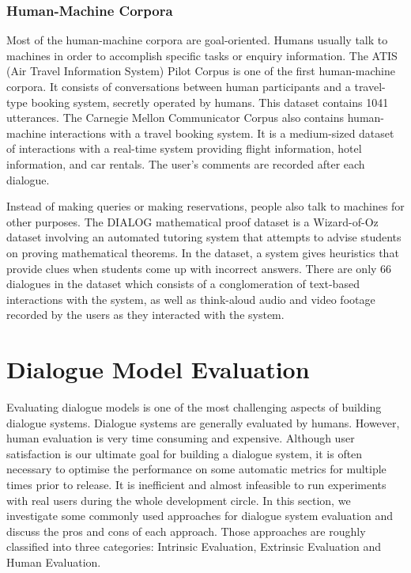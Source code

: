 \documentclass[bsc,frontabs,twoside,singlespacing,parskip,deptreport]{infthesis}     %
\begin{document}
\subsubsection*{Human-Machine Corpora}

Most of the human-machine corpora are goal-oriented. Humans usually talk to machines in order to accomplish specific tasks or enquiry information. The ATIS (Air Travel Information System) Pilot Corpus \cite{hemphill1990atis} is one of the first human-machine corpora. It consists of conversations between human participants and a travel-type booking system, secretly operated by humans. This dataset contains 1041 utterances. The Carnegie Mellon Communicator Corpus \cite{bennett2002carnegie} also contains human-machine interactions with a travel booking system. It is a medium-sized dataset of interactions with a real-time system providing flight information, hotel information, and car rentals. The user’s comments are recorded after each dialogue.

Instead of making queries or making reservations, people also talk to machines for other purposes. The DIALOG mathematical proof dataset \cite{wolska2004annotated} is a Wizard-of-Oz dataset involving an automated tutoring system that attempts to advise students on proving mathematical theorems. In the dataset, a system gives heuristics that provide clues when students come up with incorrect answers. There are only 66 dialogues in the dataset which consists of a conglomeration of text-based interactions with the system, as well as think-aloud audio and video footage recorded by the users as they interacted with the system. 


\section{Dialogue Model Evaluation}

Evaluating dialogue models is one of the most challenging aspects of building dialogue systems. Dialogue systems are generally evaluated by humans. However, human evaluation is very time consuming and expensive. Although user satisfaction is our ultimate goal for building a dialogue system, it is often necessary to optimise the performance on some automatic metrics for multiple times prior to release. It is inefficient and almost infeasible to run experiments with real users during the whole development circle. In this section, we investigate some commonly used approaches for dialogue system evaluation and discuss the pros and cons of each approach. Those approaches are roughly classified into three categories: Intrinsic Evaluation, Extrinsic Evaluation and Human Evaluation.
\end{document}
